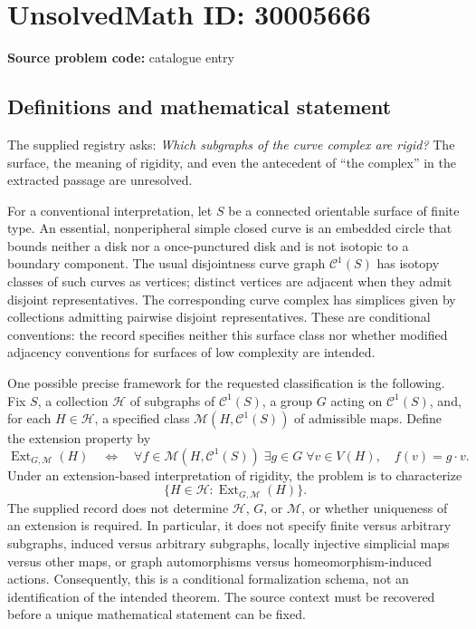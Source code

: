 \documentclass[11pt]{article}
\begin{document}
\section*{UnsolvedMath ID: 30005666}
\textbf{Source problem code:} catalogue entry
\subsection{Definitions and mathematical statement}
The supplied registry asks: \emph{Which subgraphs of the curve complex are rigid?} The surface, the meaning of rigidity, and even the antecedent of ``the complex'' in the extracted passage are unresolved.

For a conventional interpretation, let \(S\) be a connected orientable surface of finite type. An essential, nonperipheral simple closed curve is an embedded circle that bounds neither a disk nor a once-punctured disk and is not isotopic to a boundary component. The usual disjointness curve graph \(\mathcal C^1(S)\) has isotopy classes of such curves as vertices; distinct vertices are adjacent when they admit disjoint representatives. The corresponding curve complex has simplices given by collections admitting pairwise disjoint representatives. These are conditional conventions: the record specifies neither this surface class nor whether modified adjacency conventions for surfaces of low complexity are intended.

One possible precise framework for the requested classification is the following. Fix \(S\), a collection \(\mathscr H\) of subgraphs of \(\mathcal C^1(S)\), a group \(G\) acting on \(\mathcal C^1(S)\), and, for each \(H\in\mathscr H\), a specified class \(\mathscr M(H,\mathcal C^1(S))\) of admissible maps. Define the extension property by
\[
\operatorname{Ext}_{G,\mathscr M}(H)
\quad\Longleftrightarrow\quad
\forall f\in\mathscr M(H,\mathcal C^1(S))\;
\exists g\in G\;
\forall v\in V(H),\quad f(v)=g\cdot v.
\]
Under an extension-based interpretation of rigidity, the problem is to characterize
\[
\bigl\{H\in\mathscr H:\operatorname{Ext}_{G,\mathscr M}(H)\bigr\}.
\]
The supplied record does not determine \(\mathscr H\), \(G\), or \(\mathscr M\), or whether uniqueness of an extension is required. In particular, it does not specify finite versus arbitrary subgraphs, induced versus arbitrary subgraphs, locally injective simplicial maps versus other maps, or graph automorphisms versus homeomorphism-induced actions. Consequently, this is a conditional formalization schema, not an identification of the intended theorem. The source context must be recovered before a unique mathematical statement can be fixed.
\end{document}
